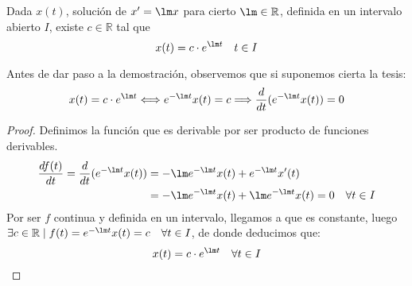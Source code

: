 \begin{prop}
    Dada $x(t)$, solución de $x'=\lm x$ para cierto $\lm \in \mathbb{R}$, definida en un intervalo abierto $I$, existe $c\in \mathbb{R}$ tal que
    \begin{equation*}
        x(t) = c \cdot e^{\lm t} \quad t\in I
    \end{equation*}
\end{prop}
Antes de dar paso a la demostración, observemos que si suponemos cierta la tesis:
\begin{equation*}
    x(t) = c \cdot e^{\lm t} \Longleftrightarrow  e^{-\lm t} x(t) = c \Longrightarrow \dfrac{d}{dt}(e^{-\lm t}x(t)) = 0
\end{equation*}
\begin{proof}
    Definimos la función
    que es derivable por ser producto de funciones derivables.
    \begin{align*}
        \dfrac{df(t)}{dt} = \dfrac{d}{dt}(e^{-\lm t}x(t)) &= -\lm e^{-\lm t} x(t) + e^{-\lm t} x'(t)\\
                          &= -\lm e^{-\lm t}x(t) + \lm e^{-\lm t}x(t) = 0 \quad \forall t\in I
    \end{align*}
    Por ser $f$ continua y definida en un intervalo, llegamos a que es constante, luego $\exists c\in \mathbb{R} \mid f(t) = e^{-\lm t}x(t) = c \quad \forall t\in I$, de donde deducimos que:
    \begin{equation*}
        x(t) = c \cdot e^{\lm t} \quad \forall t\in I
    \end{equation*}
\end{proof}

